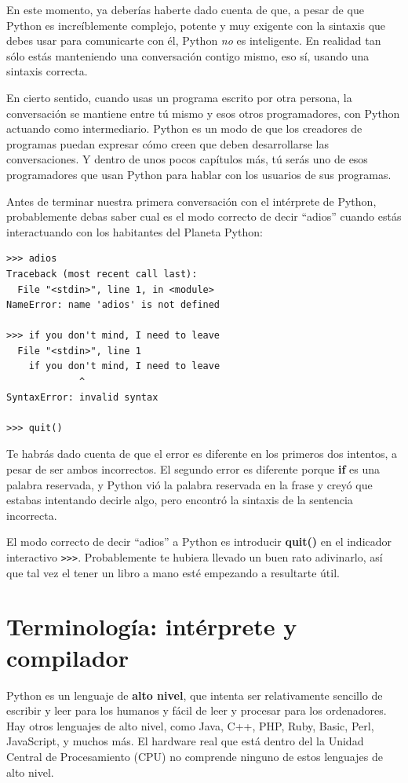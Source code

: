 En este momento, ya deberías haberte dado cuenta de que, a pesar de que Python
es increíblemente complejo, potente y muy exigente con
la sintaxis que debes usar para comunicarte con él, Python {\em no} es
inteligente. En realidad tan sólo estás manteniendo una conversación
contigo mismo, eso sí, usando una sintaxis correcta.

En cierto sentido, cuando usas un programa escrito por otra persona,
la conversación se mantiene entre tú mismo y esos otros programadores,
con Python actuando como intermediario. Python es un
modo de que los creadores de programas puedan expresar cómo creen
que deben desarrollarse las conversaciones. Y dentro
de unos pocos capítulos más, tú serás uno de esos programadores
que usan Python para hablar con los usuarios de sus programas.

Antes de terminar nuestra primera conversación con el intérprete
de Python, probablemente debas saber cual es el modo correcto
de decir ``adios'' cuando estás interactuando con los
habitantes del Planeta Python:

\beforeverb
\begin{verbatim}
>>> adios
Traceback (most recent call last):
  File "<stdin>", line 1, in <module>
NameError: name 'adios' is not defined

>>> if you don't mind, I need to leave
  File "<stdin>", line 1
    if you don't mind, I need to leave
             ^
SyntaxError: invalid syntax

>>> quit()
\end{verbatim}
\afterverb
%
Te habrás dado cuenta de que el error es diferente en los primeros
dos intentos, a pesar de ser ambos incorrectos. El segundo error es diferente porque
{\bf if} es una palabra reservada, y Python vió la palabra
reservada en la frase y creyó que estabas intentando decirle algo, pero encontró
la sintaxis de la sentencia incorrecta.

El modo correcto de decir ``adios'' a Python es introducir
{\bf quit()} en el indicador interactivo {\tt \verb">>>"}.
Probablemente te hubiera llevado un buen rato adivinarlo,
así que tal vez el tener un libro a mano
esté empezando a resultarte útil.

\section{Terminología: intérprete y compilador}

Python es un lenguaje de {\bf alto nivel}, que intenta ser relativamente
sencillo de escribir y leer para los humanos y fácil de leer y procesar para
los ordenadores. Hay otros lenguajes de alto nivel, como Java, C++,
PHP, Ruby, Basic, Perl, JavaScript, y muchos más. El hardware real que está
dentro del la Unidad Central de Procesamiento (CPU) no comprende
ninguno de estos lenguajes de alto nivel.

